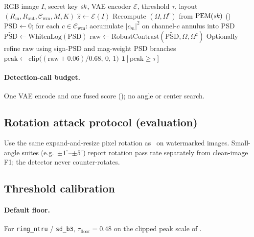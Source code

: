\begin{algorithm}[t]
\caption{Blind detection (B3 / \texttt{ring\_ntru})}
\label{alg:b3-detect}
\begin{algorithmic}[1]
\Require RGB image $I$, secret key $\mathit{sk}$, VAE encoder $\mathcal{E}$,
  threshold $\tau$, layout $(R_{\mathrm{in}},R_{\mathrm{out}},\mathcal{C}_{\mathrm{wm}},M,K)$
\State $\hat z \leftarrow \mathcal{E}(I)$
\State Recompute $(\Omega,\Omega^{\mathrm c})$ from $\mathrm{PEM}(\mathit{sk})$ ()
\State $\mathrm{PSD}\leftarrow 0$; for each $c\in\mathcal{C}_{\mathrm{wm}}$:
  accumulate $|c_m|^2$ on channel-$c$ annulus into $\mathrm{PSD}$
\State $\widetilde{\mathrm{PSD}}\leftarrow \mathrm{WhitenLog}(\mathrm{PSD})$
\State $\mathrm{raw}\leftarrow \mathrm{RobustContrast}(\widetilde{\mathrm{PSD}},\Omega,\Omega^{\mathrm c})$
\State Optionally refine $\mathrm{raw}$ using sign-PSD and mag-weight PSD branches
\State $\mathrm{peak}\leftarrow \mathrm{clip}\bigl((\mathrm{raw}+0.06)/0.68,\,0,\,1\bigr)$
\State \Return $\mathbf{1}[\mathrm{peak}\ge\tau]$
\end{algorithmic}
\end{algorithm}

\paragraph{Detection-call budget.}
One VAE encode and one fused score (); no angle or center search.

\subsection{Rotation attack protocol (evaluation)}
\label{sec:b3-rot}

Use the same expand-and-resize pixel rotation as~ on
watermarked images.
Small-angle suites (e.g.\ $\pm1^\circ$--$\pm5^\circ$) report rotation pass rate
separately from clean-image F1; the detector never counter-rotates.

\subsection{Threshold calibration}
\label{sec:b3-calib}

\paragraph{Default floor.}
For \texttt{ring\_ntru} / \texttt{sd\_b3}, $\tau_{\mathrm{floor}}=0.48$ on the clipped
peak scale of .

